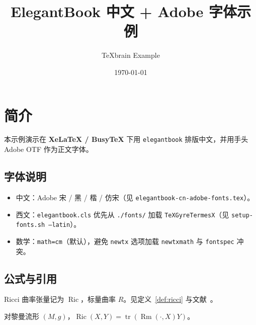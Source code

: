 \documentclass[11pt,a4paper,cn,nofont,math=cm,bibtex]{elegantbook}
\title{ElegantBook 中文 + Adobe 字体示例}
\author{TeXbrain Example}
\date{\today}
\newcommand{\Ric}{\operatorname{Ric}}
\newcommand{\Rm}{\operatorname{Rm}}
\newcommand{\tr}{\operatorname{tr}}
\begin{document}
\maketitle

\chapter{简介}

本示例演示在 \textbf{XeLaTeX / BusyTeX} 下用 \texttt{elegantbook} 排版中文，并用手头 Adobe OTF 作为正文字体。

\section{字体说明}

\begin{itemize}
  \item 中文：Adobe 宋 / 黑 / 楷 / 仿宋（见 \texttt{elegantbook-cn-adobe-fonts.tex}）。
  \item 西文：\texttt{elegantbook.cls} 优先从 \texttt{./fonts/} 加载 \texttt{TeXGyreTermesX}（见 \texttt{setup-fonts.sh --latin}）。
  \item 数学：\texttt{math=cm}（默认），避免 \texttt{newtx} 选项加载 \texttt{newtxmath} 与
        \texttt{fontspec} 冲突。
\end{itemize}

\section{公式与引用}

Ricci 曲率张量记为 $\Ric$，标量曲率 $R$。见定义~\ref{def:ricci} 与文献~\cite{Hamilton1982}。

\begin{definition}[Ricci 曲率]\label{def:ricci}
  对黎曼流形 $(M,g)$，$\Ric(X,Y)=\tr(\Rm(\cdot,X)Y)$。
\end{definition}

\printbibliography
\end{document}
